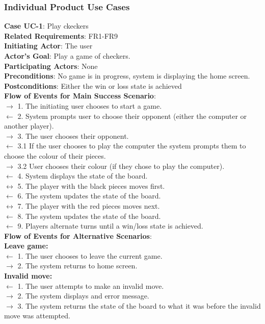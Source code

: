 \documentclass[12pt, titlepage]{article}
\begin{document}
\subsubsection{Individual Product Use Cases}
    \textbf{Case UC-1}: Play ckeckers\\
    \textbf{Related Requirements}: FR1-FR9\\
    \textbf{Initiating Actor}: The user\\
    \textbf{Actor's Goal}: Play a game of checkers.\\
    \textbf{Participating Actors}: None\\
    \textbf{Preconditions}: No game is in progress, system is displaying the home screen.\\
    \textbf{Postconditions}: Either the win or loss state is achieved\\
    \textbf{Flow of Events for Main Success Scenario}:\\
    $\rightarrow$ 1. The initiating user chooses to start a game.\\
    $\leftarrow$ 2. System prompts user to choose their opponent (either the computer or another player).\\
    $\rightarrow$ 3. The user chooses their opponent.\\
    $\leftarrow$ 3.1 If the user chooses to play the computer the system prompts them to choose the colour of their pieces.\\
    $\rightarrow$ 3.2 User chooses their colour (if they chose to play the computer).\\
    $\leftarrow$ 4. System displays the state of the board.\\
    $\leftrightarrow$ 5. The player with the black pieces moves first.\\
    $\leftarrow$ 6. The system updates the state of the board.\\
    $\leftrightarrow$ 7. The player with the red pieces moves next.\\
    $\leftarrow$ 8. The system updates the state of the board.\\
    $\leftarrow$ 9. Players alternate turns until a win/loss state is achieved.\\
    \textbf{Flow of Events for Alternative Scenarios}:\\
    \textbf{Leave game:}\\
    $\leftarrow$ 1. The user chooses to leave the current game.\\
    $\rightarrow$ 2. The system returns to home screen.\\
    \textbf{Invalid move:}\\
    $\leftarrow$ 1. The user attempts to make an invalid move.\\
    $\rightarrow$ 2. The system displays and error message.\\
    $\rightarrow$ 3. The system returns the state of the board to what it was before the invalid move was attempted.
    
\end{document}
